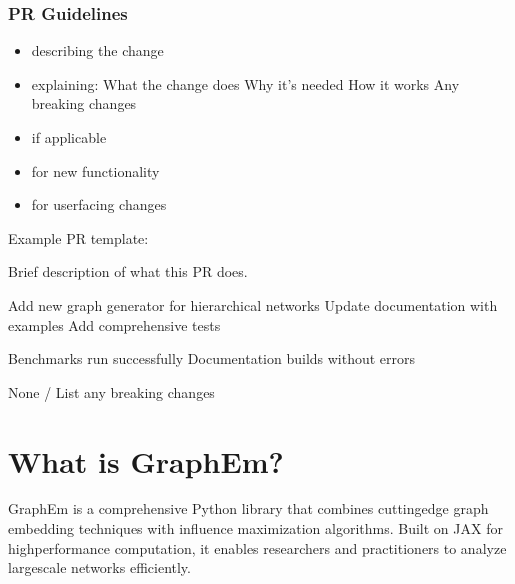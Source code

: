 \documentclass[letterpaper,10pt,english]{sphinxmanual}
\begin{document}
\subsection{PR Guidelines}
\label{\detokenize{contributing:pr-guidelines}}\begin{itemize}
\item {} 
\sphinxAtStartPar
{} describing the change

\item {} 
\sphinxAtStartPar
{} explaining:
\sphinxhyphen{} What the change does
\sphinxhyphen{} Why it’s needed
\sphinxhyphen{} How it works
\sphinxhyphen{} Any breaking changes

\item {} 
\sphinxAtStartPar
{} if applicable

\item {} 
\sphinxAtStartPar
{} for new functionality

\item {} 
\sphinxAtStartPar
{} for user\sphinxhyphen{}facing changes

\end{itemize}

\sphinxAtStartPar
Example PR template:

\begin{sphinxVerbatim}[commandchars=\\\{\}]
Brief description of what this PR does.

Add new graph generator for hierarchical networks
Update documentation with examples
Add comprehensive tests

 Benchmarks run successfully
 Documentation builds without errors

None / List any breaking changes
\end{sphinxVerbatim}


\chapter{What is GraphEm?}
\label{\detokenize{index:what-is-graphem}}
\sphinxAtStartPar
GraphEm is a comprehensive Python library that combines cutting\sphinxhyphen{}edge graph embedding techniques with influence maximization algorithms. Built on JAX for high\sphinxhyphen{}performance computation, it enables researchers and practitioners to analyze large\sphinxhyphen{}scale networks efficiently.
\end{document}
